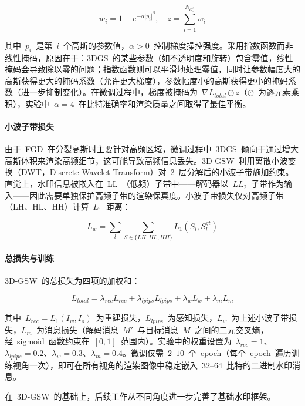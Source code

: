 \begin{equation}
  w_i = 1 - e^{-\alpha |p_i|^\beta}, \quad z = \sum_{i=1}^{N_{G^*_o}} w_i
\end{equation}

其中~$p_i$~是第~$i$~个高斯的参数值，$\alpha > 0$~控制梯度操控强度。采用指数函数而非线性掩码，原因在于：3DGS~的某些参数（如不透明度和旋转）包含零值，线性掩码会导致除以零的问题；指数函数则可以平滑地处理零值，同时让参数幅度大的高斯获得更大的掩码系数（允许更大梯度），参数幅度小的高斯获得更小的掩码系数（进一步抑制变化）。在微调过程中，梯度被掩码为~$\nabla L_{total} \odot z$（$\odot$~为逐元素乘积），实验中~$\alpha = 4$~在比特准确率和渲染质量之间取得了最佳平衡。

\paragraph{小波子带损失}
由于~FGD~在分裂高斯时主要针对高频区域，微调过程中~3DGS~倾向于通过增大高斯体积来渲染高频细节，这可能导致高频信息丢失。3D-GSW~利用离散小波变换（DWT，Discrete Wavelet Transform）对~2~层分解后的小波子带施加约束。直觉上，水印信息被嵌入在~LL~（低频）子带中——解码器以~$LL_2$~子带作为输入——因此需要单独保护高频子带的渲染保真度。小波子带损失仅对高频子带（LH、HL、HH）计算~$L_1$~距离：

\begin{equation}
  L_w = \sum_{l} \sum_{S \in \{LH, HL, HH\}} L_1(S_l, S^{gt}_l)
\end{equation}

\paragraph{总损失与训练}
3D-GSW~的总损失为四项的加权和：

\begin{equation}
  L_{total} = \lambda_{rec} L_{rec} + \lambda_{lpips} L_{lpips} + \lambda_w L_w + \lambda_m L_m
\end{equation}

其中~$L_{rec} = L_1(I_w, I_o)$~为重建损失，$L_{lpips}$~为感知损失，$L_w$~为上述小波子带损失，$L_m$~为消息损失（解码消息~$M'$~与目标消息~$M$~之间的二元交叉熵，经~sigmoid~函数约束在~$[0,1]$~范围内）。实验中的权重设置为~$\lambda_{rec} = 1$、$\lambda_{lpips} = 0.2$、$\lambda_w = 0.3$、$\lambda_m = 0.4$。微调仅需~$2$--$10$~个~epoch（每个~epoch~遍历训练视角一次），即可在所有视角的渲染图像中稳定嵌入~$32$--$64$~比特的二进制水印消息。

在~3D-GSW~的基础上，后续工作从不同角度进一步完善了基础水印框架。

